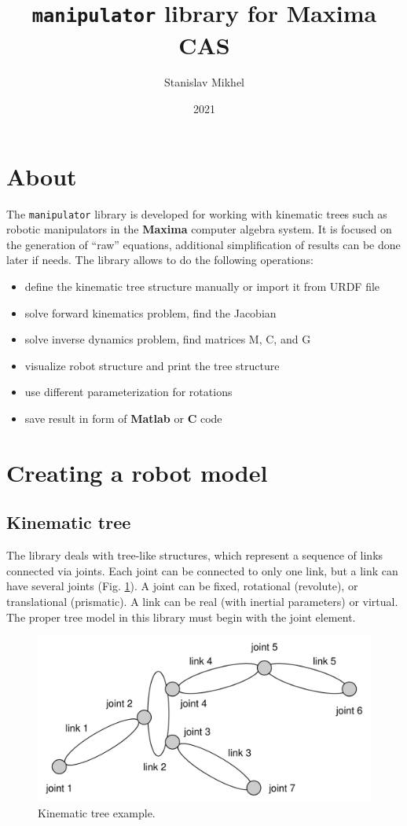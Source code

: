 \documentclass{article}
\title{\texttt{manipulator} library for \textbf{Maxima} CAS}
\author{Stanislav Mikhel}
\date{2021}
\begin{document}
\maketitle

\section{About} 

The \texttt{manipulator} library is developed for working with kinematic trees such as robotic manipulators in the \textbf{Maxima} computer algebra system. It is focused on the generation of ``raw'' equations, additional simplification of results can be done later if needs. The library allows to do the following operations: 
\begin{itemize}
    \item define the kinematic tree structure manually or import it from URDF file 
    \item solve forward kinematics problem, find the Jacobian 
    \item solve inverse dynamics problem, find matrices M, C, and G 
    \item visualize robot structure and print the tree structure 
    \item use different parameterization for rotations
    \item save result in form of \textbf{Matlab} or \textbf{C} code
\end{itemize}

\section{Creating a robot model} 

\subsection{Kinematic tree} 

The library deals with tree-like structures, which represent a sequence of links connected via joints. Each joint can be connected to only one link, but a link can have several joints (Fig. \ref{fig:kinematic_tree}). A joint can be fixed, rotational (revolute), or translational (prismatic). A link can be real (with inertial parameters) or virtual.  The proper tree model in this library must begin with the joint element. 

\begin{figure}[t]
    \centering
    \includegraphics[width=0.8\linewidth]{img/tree_struct.png}
    \caption{Kinematic tree example.}
    \label{fig:kinematic_tree}
\end{figure}
\end{document}
